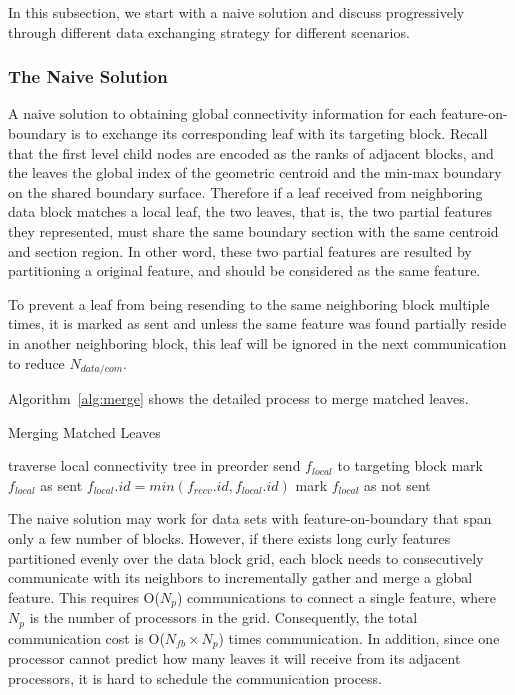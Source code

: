 \documentclass[10pt, conference, compsocconf]{IEEEtran}
\begin{document}
In this subsection, we start with a naive solution and discuss progressively through different data exchanging strategy for different scenarios.

\subsubsection{The Naive Solution}

A naive solution to obtaining global connectivity information for each feature-on-boundary is to exchange its corresponding leaf with its targeting block. Recall that the first level child nodes are encoded as the ranks of adjacent blocks, and the leaves the global index of the geometric centroid and the min-max boundary on the shared boundary surface. Therefore if a leaf received from neighboring data block matches a local leaf, the two leaves, that is, the two partial features they represented, must share the same boundary section with the same centroid and section region. In other word, these two partial features are resulted by partitioning a original feature, and should be considered as the same feature.

To prevent a leaf from being resending to the same neighboring block multiple times, it is marked as sent and unless the same feature was found partially reside in another neighboring block, this leaf will be ignored in the next communication to reduce $N_{data/com}$.

Algorithm~\ref{alg:merge} shows the detailed process to merge matched leaves.
\begin{algorithm}
\caption{Merging Matched Leaves}
\label{alg:merge}
\begin{algorithmic}
\STATE traverse local connectivity tree in preorder
		\STATE send $f_{local}$ to targeting block
	\ENDIF
	\STATE mark $f_{local}$ as sent
\ENDFOR
{}
			\STATE $f_{local}.id = min(f_{recv}.id, f_{local}.id)$
			\STATE mark $f_{local}$ as not sent
		\ENDIF
	\ENDFOR	
\ENDFOR
\end{algorithmic}
\end{algorithm}

The naive solution may work for data sets with feature-on-boundary that span only a few number of blocks. However, if there exists long curly features partitioned evenly over the data block grid, each block needs to consecutively communicate with its neighbors to incrementally gather and merge a global feature. This requires O(${N_p}$) communications to connect a single feature, where ${N_p}$ is the number of processors in the grid. Consequently, the total communication cost is O(${N_{fb} \times N_p}$) times communication. In addition, since one processor cannot predict how many leaves it will receive from its adjacent processors, it is hard to schedule the communication process. 
\end{document}
